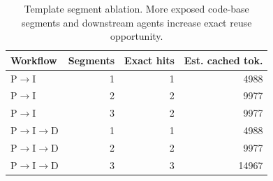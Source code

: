 \begin{table}[t]
\centering
\caption{Template segment ablation. More exposed code-base segments and downstream agents increase exact reuse opportunity.}
\label{tab:template-segments}
\begin{tabular}{lrrr}
\toprule
Workflow & Segments & Exact hits & Est. cached tok. \\
\midrule
P$\rightarrow$I & 1 & 1 & 4988 \\
P$\rightarrow$I & 2 & 2 & 9977 \\
P$\rightarrow$I & 3 & 2 & 9977 \\
P$\rightarrow$I$\rightarrow$D & 1 & 1 & 4988 \\
P$\rightarrow$I$\rightarrow$D & 2 & 2 & 9977 \\
P$\rightarrow$I$\rightarrow$D & 3 & 3 & 14967 \\
\bottomrule
\end{tabular}
\end{table}
